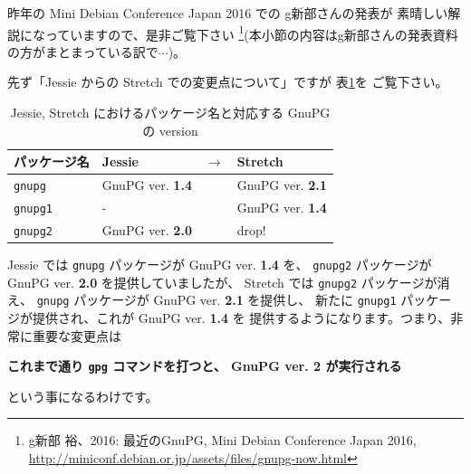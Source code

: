 \documentclass[mingoth,a4paper]{jsarticle}
\begin{document}
昨年の Mini Debian Conference Japan 2016 での g新部さんの発表が
素晴しい解説になっていますので、是非ご覧下さい
\footnote{%
  g新部 裕、2016: 最近のGnuPG, Mini Debian Conference Japan 2016,\\
  \url{http://miniconf.debian.or.jp/assets/files/gnupg-now.html}
}(本小節の内容はg新部さんの発表資料の方がまとまっている訳で$\cdots$)。

先ず「Jessie からの Stretch での変更点について」ですが
表\ref{table:Jessie, Stretch におけるパッケージ名と対応する GnuPG の version}を
ご覧下さい。
\begin{table}
  \caption{Jessie, Stretch におけるパッケージ名と対応する GnuPG の version}
  \label{table:Jessie, Stretch におけるパッケージ名と対応する GnuPG の version}
  \centering
  \begin{tabular}[htbp!]{llcl}
    \hline
    パッケージ名     & Jessie                  & $\to$ & Stretch                 \\
    \hline
    \texttt{gnupg}   & GnuPG ver. \textbf{1.4} &       & GnuPG ver. \textbf{2.1} \\
    \texttt{gnupg1}  & -                       &       & GnuPG ver. \textbf{1.4} \\
    \texttt{gnupg2}  & GnuPG ver. \textbf{2.0} &       & drop!                   \\
    \hline
  \end{tabular}
\end{table}
Jessie では \texttt{gnupg} パッケージが GnuPG ver. \textbf{1.4} を、
\texttt{gnupg2} パッケージが GnuPG ver. \textbf{2.0} を提供していましたが、
Stretch では \texttt{gnupg2} パッケージが消え、
\texttt{gnupg} パッケージが GnuPG ver. \textbf{2.1} を提供し、
新たに \texttt{gnupg1} パッケージが提供され、これが GnuPG ver. \textbf{1.4} を
提供するようになります。つまり、非常に重要な変更点は
\begin{center}
  \textbf{%
    これまで通り \texttt{gpg} コマンドを打つと、%
    GnuPG ver. 2 が実行される
  }
\end{center}
という事になるわけです。
\end{document}
